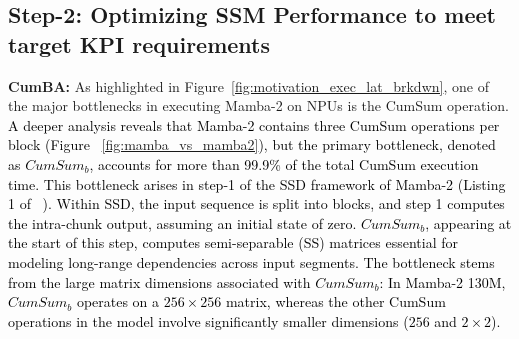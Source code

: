 \subsection{Step-2: Optimizing SSM Performance to meet target KPI requirements}

\textbf{CumBA:}  
As highlighted in Figure~\ref{fig:motivation_exec_lat_brkdwn}, one of the major bottlenecks in executing Mamba-2 on NPUs is the CumSum operation.
\textcolor{black}{A deeper analysis reveals that Mamba-2 contains three CumSum operations per block (Figure ~\ref{fig:mamba_vs_mamba2}), but the primary bottleneck, denoted as $CumSum_b$, accounts for more than 99.9\% of the total CumSum execution time. This bottleneck arises in step-1 of the SSD framework of Mamba-2 (Listing 1 of ~\cite{mamba2}).  
Within SSD, the input sequence is split into blocks, and step 1 computes the intra-chunk output, assuming an initial state of zero. $CumSum_b$, appearing at the start of this step, computes semi-separable (SS) matrices essential for modeling long-range dependencies across input segments.
The bottleneck stems from the large matrix dimensions associated with $CumSum_b$: In Mamba-2 130M, $CumSum_b$ operates on a $256 \times 256$ matrix, whereas the other CumSum operations in the model involve significantly smaller dimensions ($256$ and $2 \times 2$). }
